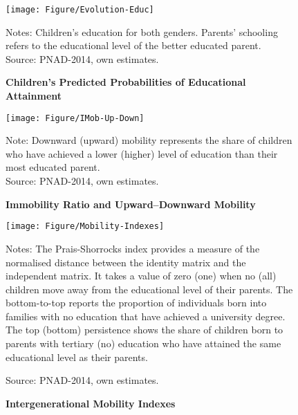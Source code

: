 \documentclass[a4paper, 12pt]{article}
\begin{document}
 


\begin{landscape}
\begin{figure}[htb]
\centering
\texttt{[image: Figure/Evolution-Educ]}
\vspace{-0.2em}
\begin{minipage}{1.69\textwidth} %
{\scriptsize
Notes: Children's education for both genders. Parents’ schooling refers to the educational level of the better educated parent.\\
Source: PNAD-2014, own estimates.\par}
\end{minipage}
\captionsetup{justification=centering,margin=2cm}
\caption{\textbf{Children’s Predicted Probabilities of Educational Attainment}}
\label{fig:Evolution-Educ}
\end{figure}
\end{landscape}
\restoregeometry




\begin{figure}[htb]
\centering
\texttt{[image: Figure/IMob-Up-Down]}
\begin{minipage}{0.87\textwidth} %
{\scriptsize
Note: Downward (upward) mobility represents the share of children who have achieved a lower (higher) level of education than their most educated parent.\\
Source: PNAD-2014, own estimates.\par}
\end{minipage}
\captionsetup{justification=centering,margin=1cm}
\caption{\textbf{Immobility Ratio and Upward–Downward Mobility}}
\label{fig:Figure-IMob-Up-Down}
\end{figure}




\begin{figure}[H]
\centering
\texttt{[image: Figure/Mobility-Indexes]}
\begin{minipage}{0.87\textwidth} %
{\scriptsize
Notes: The Prais-Shorrocks index provides a measure of the normalised distance between the identity matrix and the independent matrix. It takes a value of zero (one) when no (all) children move away from the educational level of their parents. The bottom-to-top reports the proportion of individuals born into families with no education that have achieved a university degree. The top (bottom) persistence shows the share of children born to parents with tertiary (no) education who have attained the same educational level as their parents.

Source: PNAD-2014, own estimates.\par}
\end{minipage}
\captionsetup{justification=centering,margin=2cm}
\caption{\textbf{Intergenerational Mobility Indexes}}
\label{fig:Mobility-Indexes}
\end{figure}
\end{document}
